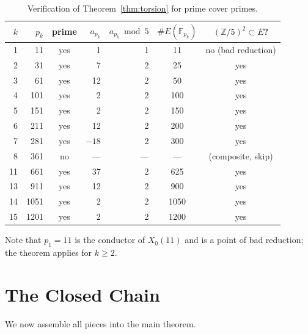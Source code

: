 \documentclass[11pt,a4paper]{article}
\theoremstyle{definition}
\newcommand{\ZZ}{\mathbb{Z}}
\newcommand{\FF}{\mathbb{F}}
\newcommand{\pk}{p_k}
\newcommand{\Xo}{X_0(11)}
\newcommand{\Ek}{E(\FF_{\pk})}
\begin{document}
\begin{table}[h]
\centering
\caption{Verification of Theorem~\ref{thm:torsion} for prime cover primes.}
\label{tab:hecke}
\begin{tabular}{rrcrrcc}
\toprule
$k$ & $\pk$ & prime & $a_{\pk}$ & $a_{\pk} \bmod 5$ & $\#\Ek$ & $(\ZZ/5)^2 \subset E$? \\
\midrule
1 & 11  & yes & 1   & 1 & 11  & no (bad reduction) \\
2 & 31  & yes & 7   & 2 & 25  & yes \\
3 & 61  & yes & 12  & 2 & 50  & yes \\
4 & 101 & yes & 2   & 2 & 100 & yes \\
5 & 151 & yes & 2   & 2 & 150 & yes \\
6 & 211 & yes & 12  & 2 & 200 & yes \\
7 & 281 & yes & $-18$ & 2 & 300 & yes \\
8 & 361 & no  & --- & --- & --- & (composite, skip) \\
11 & 661 & yes & 37 & 2 & 625 & yes \\
13 & 911 & yes & 12 & 2 & 900 & yes \\
14 & 1051& yes & 2  & 2 & 1050& yes \\
15 & 1201& yes & 2  & 2 & 1200& yes \\
\bottomrule
\end{tabular}
\end{table}

Note that $p_1 = 11$ is the conductor of $\Xo$ and is a point of
bad reduction; the theorem applies for $k \geq 2$.

\section{The Closed Chain}
\label{sec:chain}

We now assemble all pieces into the main theorem.
\end{document}
